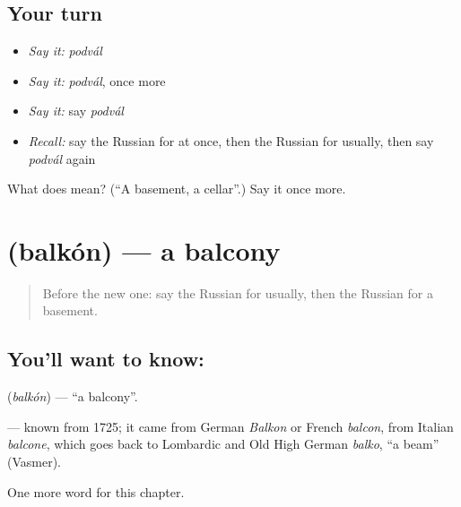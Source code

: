 \subsection*{Your turn}
\begin{itemize}
\raggedright
  \item \emph{Say it:} \emph{podvál}
  \item \emph{Say it:} \emph{podvál}, once more
  \item \emph{Say it:} say \emph{podvál}
  \item \emph{Recall:} say the Russian for at once, then the Russian for usually, then say \emph{podvál} again
\end{itemize}

\begin{tcolorbox}[breakable,colback=teal!4,colframe=teal!35!black,title={Before you move on}]
What does  mean? (\textquotedblleft{}A basement, a cellar\textquotedblright{}.) Say it once more.
\end{tcolorbox}
\section[\texorpdfstring{\ru{балкон} (balkón)}{балкон (balkón)}]{ (balkón) — a balcony}

\label{lesson:RU-C241-balkon}



\begin{quote}
Before the new one: say the Russian for usually, then the Russian for a basement.
\end{quote}

\subsection*{You'll want to know: }
\textbf{} (\emph{balkón}) — \textquotedblleft{}a balcony\textquotedblright{}.

\begin{cousinweb}
\textbf{} — known from 1725; it came from German \emph{Balkon} or French \emph{balcon}, from Italian \emph{balcone}, which goes back to Lombardic and Old High German \emph{balko}, \textquotedblleft{}a beam\textquotedblright{} (Vasmer).
\end{cousinweb}

\begin{grammarlens}[title={What you've built}]
One more word for this chapter.
\end{grammarlens}

